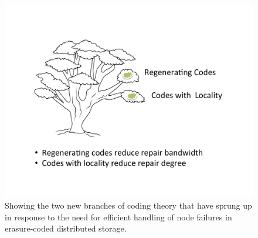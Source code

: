 		\begin{figure}[!h]
			\centering
			\includegraphics[scale=.5]{src/Figures/chap4/oak_2}  
			\caption{Showing the two new branches of coding theory that have sprung up in response to the need for efficient handling of node failures in erasure-coded distributed storage.}  \label{fig:oak_2}    
		\end{figure}


